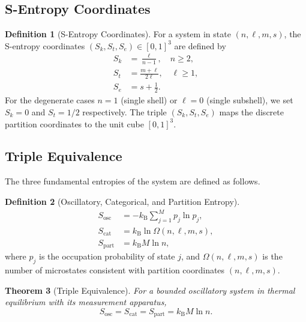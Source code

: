 \documentclass[11pt,twocolumn,a4paper]{article}
\newtheorem{theorem}{Theorem}[section]
\theoremstyle{definition}
\newtheorem{definition}[theorem]{Definition}
\theoremstyle{remark}
\newcommand{\Sosc}{S_{\mathrm{osc}}}
\newcommand{\Scat}{S_{\mathrm{cat}}}
\newcommand{\Spart}{S_{\mathrm{part}}}
\newcommand{\Sk}{S_{k}}
\newcommand{\St}{S_{t}}
\newcommand{\Se}{S_{e}}
\newcommand{\kB}{k_{\mathrm{B}}}
\begin{document}
\subsection{S-Entropy Coordinates}

\begin{definition}[S-Entropy Coordinates]\label{def:s-entropy}
For a system in state $(n, \ell, m, s)$, the S-entropy coordinates $(\Sk, \St, \Se) \in [0,1]^3$ are defined by
\begin{align}
    \Sk &= \frac{\ell}{n - 1}, \quad n \geq 2, \label{eq:Sk} \\
    \St &= \frac{m + \ell}{2\ell}, \quad \ell \geq 1, \label{eq:St} \\
    \Se &= s + \tfrac{1}{2}. \label{eq:Se}
\end{align}
For the degenerate cases $n = 1$ (single shell) or $\ell = 0$ (single subshell), we set $\Sk = 0$ and $\St = 1/2$ respectively.  The triple $(\Sk, \St, \Se)$ maps the discrete partition coordinates to the unit cube $[0,1]^3$.
\end{definition}

\subsection{Triple Equivalence}

The three fundamental entropies of the system are defined as follows.

\begin{definition}[Oscillatory, Categorical, and Partition Entropy]\label{def:triple-entropy}
\begin{align}
    \Sosc &= -\kB \sum_{j=1}^{M} p_j \ln p_j, \label{eq:Sosc}\\
    \Scat &= \kB \ln \Omega(n, \ell, m, s), \label{eq:Scat}\\
    \Spart &= \kB M \ln n, \label{eq:Spart}
\end{align}
where $p_j$ is the occupation probability of state $j$, and $\Omega(n, \ell, m, s)$ is the number of microstates consistent with partition coordinates $(n, \ell, m, s)$.
\end{definition}

\begin{theorem}[Triple Equivalence]\label{thm:triple-equivalence}
For a bounded oscillatory system in thermal equilibrium with its measurement apparatus,
\begin{equation}\label{eq:triple-equivalence}
    \Sosc = \Scat = \Spart = \kB M \ln n.
\end{equation}
\end{theorem}
\end{document}
